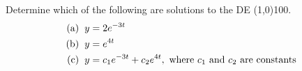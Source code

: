 \documentclass[12pt]{article}
\newcommand{\<}{\langle}
\renewcommand{\>}{\rangle}
\begin{document}
  Determine which of the following are solutions to the DE \line(1,0){100}.
	\begin{align*}
	\mbox{(a)}	\hspace{0.2cm} y	&= 2e^{-3t}\\ %
	\mbox{(b)}	\hspace{0.2cm} y	&= e^{4t}\\
	\mbox{(c)}	\hspace{0.2cm} y	&= c_1e^{-3t} + c_2e^{4t}, \mbox{ where $c_1$ and $c_2$ are constants}\\
	\end{align*}
%
\end{document}
